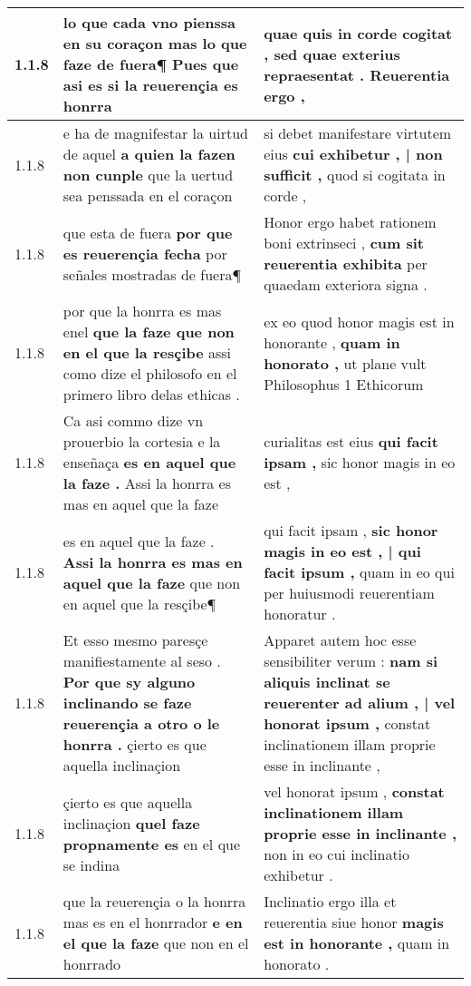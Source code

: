 \begin{tabular}{|p{1cm}|p{6.5cm}|p{6.5cm}|}
1.1.8 & lo que cada vno pienssa en su coraçon \textbf{ mas lo que faze de fuera¶ } Pues que asi es si la reuerençia es honrra & quae quis in corde cogitat , \textbf{ sed quae exterius repraesentat . } Reuerentia ergo , \\\hline
1.1.8 & e ha de magnifestar la uirtud de aquel \textbf{ a quien la fazen non cunple } que la uertud sea penssada en el coraçon & si debet manifestare virtutem eius \textbf{ cui exhibetur , | non sufficit , } quod si cogitata in corde , \\\hline
1.1.8 & que esta de fuera \textbf{ por que es reuerençia fecha } por señales mostradas de fuera¶ & Honor ergo habet rationem boni extrinseci , \textbf{ cum sit reuerentia exhibita } per quaedam exteriora signa . \\\hline
1.1.8 & por que la honrra es mas enel \textbf{ que la faze que non en el que la resçibe } assi como dize el philosofo en el primero libro delas ethicas . & ex eo quod honor magis est in honorante , \textbf{ quam in honorato , } ut plane vult Philosophus 1 Ethicorum \\\hline
1.1.8 & Ca asi commo dize vn prouerbio la cortesia e la enseñaça \textbf{ es en aquel que la faze . } Assi la honrra es mas en aquel que la faze & curialitas est eius \textbf{ qui facit ipsam , } sic honor magis in eo est , \\\hline
1.1.8 & es en aquel que la faze . \textbf{ Assi la honrra es mas en aquel que la faze } que non en aquel que la resçibe¶ & qui facit ipsam , \textbf{ sic honor magis in eo est , | qui facit ipsum , } quam in eo qui per huiusmodi reuerentiam honoratur . \\\hline
1.1.8 & Et esso mesmo paresçe manifiestamente al seso . \textbf{ Por que sy alguno inclinando se faze reuerençia a otro o le honrra . } çierto es que aquella inclinaçion & Apparet autem hoc esse sensibiliter verum : \textbf{ nam si aliquis inclinat se reuerenter ad alium , | vel honorat ipsum , } constat inclinationem illam proprie esse in inclinante , \\\hline
1.1.8 & çierto es que aquella inclinaçion \textbf{ quel faze propnamente es } en el que se indina & vel honorat ipsum , \textbf{ constat inclinationem illam proprie esse in inclinante , } non in eo cui inclinatio exhibetur . \\\hline
1.1.8 & que la reuerençia o la honrra mas es en el honrrador \textbf{ e en el que la faze } que non en el honrrado & Inclinatio ergo illa et reuerentia siue honor \textbf{ magis est in honorante , } quam in honorato . \\\hline

\end{tabular}
